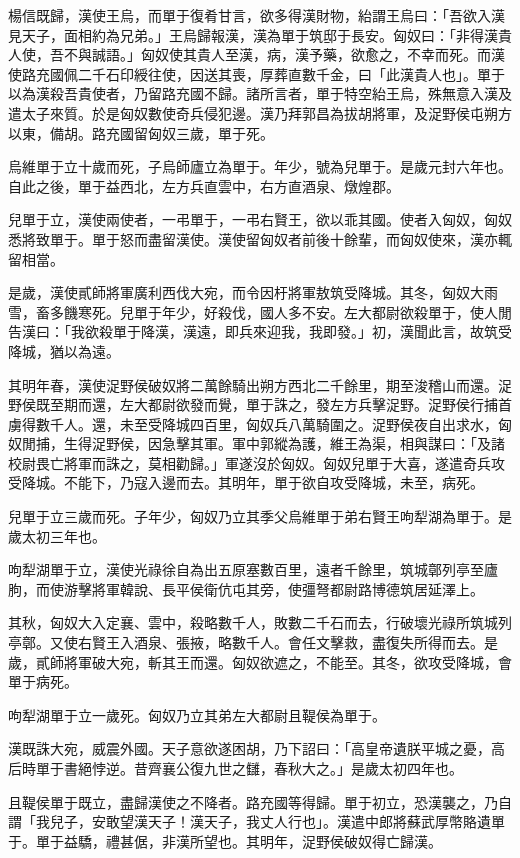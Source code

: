 \begin{pinyinscope}
楊信既歸，漢使王烏，而單于復肴甘言，欲多得漢財物，紿謂王烏曰：「吾欲入漢見天子，面相約為兄弟。」王烏歸報漢，漢為單于筑邸于長安。匈奴曰：「非得漢貴人使，吾不與誠語。」匈奴使其貴人至漢，病，漢予藥，欲愈之，不幸而死。而漢使路充國佩二千石印綬往使，因送其喪，厚葬直數千金，曰「此漢貴人也」。單于以為漢殺吾貴使者，乃留路充國不歸。諸所言者，單于特空紿王烏，殊無意入漢及遣太子來質。於是匈奴數使奇兵侵犯邊。漢乃拜郭昌為拔胡將軍，及浞野侯屯朔方以東，備胡。路充國留匈奴三歲，單于死。

烏維單于立十歲而死，子烏師廬立為單于。年少，號為兒單于。是歲元封六年也。自此之後，單于益西北，左方兵直雲中，右方直酒泉、燉煌郡。

兒單于立，漢使兩使者，一弔單于，一弔右賢王，欲以乖其國。使者入匈奴，匈奴悉將致單于。單于怒而盡留漢使。漢使留匈奴者前後十餘輩，而匈奴使來，漢亦輒留相當。

是歲，漢使貳師將軍廣利西伐大宛，而令因杅將軍敖筑受降城。其冬，匈奴大雨雪，畜多饑寒死。兒單于年少，好殺伐，國人多不安。左大都尉欲殺單于，使人閒告漢曰：「我欲殺單于降漢，漢遠，即兵來迎我，我即發。」初，漢聞此言，故筑受降城，猶以為遠。

其明年春，漢使浞野侯破奴將二萬餘騎出朔方西北二千餘里，期至浚稽山而還。浞野侯既至期而還，左大都尉欲發而覺，單于誅之，發左方兵擊浞野。浞野侯行捕首虜得數千人。還，未至受降城四百里，匈奴兵八萬騎圍之。浞野侯夜自出求水，匈奴閒捕，生得浞野侯，因急擊其軍。軍中郭縱為護，維王為渠，相與謀曰：「及諸校尉畏亡將軍而誅之，莫相勸歸。」軍遂沒於匈奴。匈奴兒單于大喜，遂遣奇兵攻受降城。不能下，乃寇入邊而去。其明年，單于欲自攻受降城，未至，病死。

兒單于立三歲而死。子年少，匈奴乃立其季父烏維單于弟右賢王呴犁湖為單于。是歲太初三年也。

呴犁湖單于立，漢使光祿徐自為出五原塞數百里，遠者千餘里，筑城鄣列亭至廬朐，而使游擊將軍韓說、長平侯衛伉屯其旁，使彊弩都尉路博德筑居延澤上。

其秋，匈奴大入定襄、雲中，殺略數千人，敗數二千石而去，行破壞光祿所筑城列亭鄣。又使右賢王入酒泉、張掖，略數千人。會任文擊救，盡復失所得而去。是歲，貳師將軍破大宛，斬其王而還。匈奴欲遮之，不能至。其冬，欲攻受降城，會單于病死。

呴犁湖單于立一歲死。匈奴乃立其弟左大都尉且鞮侯為單于。

漢既誅大宛，威震外國。天子意欲遂困胡，乃下詔曰：「高皇帝遺朕平城之憂，高后時單于書絕悖逆。昔齊襄公復九世之讎，春秋大之。」是歲太初四年也。

且鞮侯單于既立，盡歸漢使之不降者。路充國等得歸。單于初立，恐漢襲之，乃自謂「我兒子，安敢望漢天子！漢天子，我丈人行也」。漢遣中郎將蘇武厚幣賂遺單于。單于益驕，禮甚倨，非漢所望也。其明年，浞野侯破奴得亡歸漢。


\end{pinyinscope}

